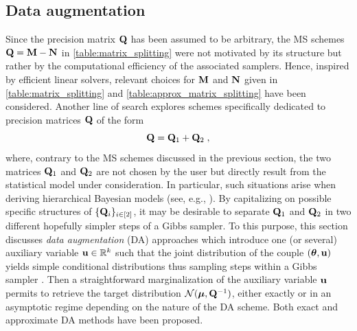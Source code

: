 \documentclass[nohypdvips,onefignum,onetabnum]{siamart171218}
\begin{document}
\subsection{Data augmentation}
\label{subsec:data_aug}

Since the precision matrix $\mathbf{Q}$ has been assumed to be arbitrary, the MS schemes $\mathbf{Q} = \mathbf{M} - \mathbf{N}$ in \cref{table:matrix_splitting} were not motivated by its structure but rather by the computational efficiency of the associated samplers.
Hence, inspired by efficient linear solvers, relevant choices for $\mathbf{M}$ and $\mathbf{N}$ given in \cref{table:matrix_splitting} and \cref{table:approx_matrix_splitting} have been considered.
Another line of search explores schemes specifically dedicated to precision matrices $\mathbf{Q}$ of the form
\begin{equation}
  \B{Q} = \B{Q}_1 + \B{Q}_2\eqsp,
  \label{eq:precision_sum}
\end{equation}
where, contrary to the MS schemes discussed in the previous section, the two matrices $\mathbf{Q}_1$ and $\mathbf{Q}_2$ are not chosen by the user but directly result from the statistical model under consideration. In particular, such situations arise when deriving hierarchical Bayesian models (see, e.g., \cite{Rue2005,Idier2008,Orieux2010}). 
By capitalizing on possible specific structures of $\{\mathbf{Q}_i\}_{i \in [2]}$, it may be desirable to separate $\mathbf{Q}_1$ and $\mathbf{Q}_2$ in two different hopefully simpler steps of a Gibbs sampler. To this purpose, this section discusses \textit{data augmentation} (DA) approaches which introduce one (or several) auxiliary variable $\mathbf{u} \in \mathbb{R}^k$ such that the joint distribution of the couple $(\boldsymbol{\theta},\mathbf{u})$ yields simple conditional distributions thus sampling steps within a Gibbs sampler \cite{Barbos2017,Marnissi2018,Vono2019,Marnissi2019}.
Then a straightforward marginalization of the auxiliary variable $\mathbf{u}$ permits to retrieve the target distribution $\mathcal{N}(\boldsymbol{\mu},\mathbf{Q}^{-1})$, either exactly or in an asymptotic regime depending on the nature of the DA scheme.
Both exact and approximate DA methods have been proposed.
\end{document}
